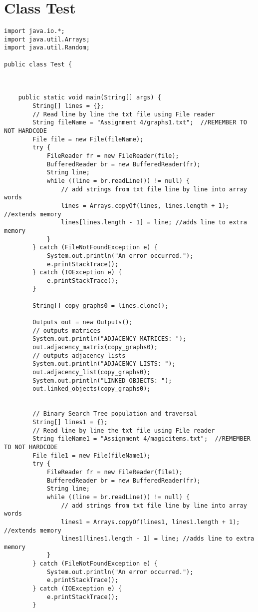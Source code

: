 \documentclass{article}
\begin{document}
\section{Class Test}
\begin{lstlisting}
import java.io.*;
import java.util.Arrays;
import java.util.Random;

public class Test {



    public static void main(String[] args) {
        String[] lines = {};
        // Read line by line the txt file using File reader
        String fileName = "Assignment 4/graphs1.txt";  //REMEMBER TO NOT HARDCODE
        File file = new File(fileName);
        try {
            FileReader fr = new FileReader(file);
            BufferedReader br = new BufferedReader(fr);
            String line;
            while ((line = br.readLine()) != null) {
                // add strings from txt file line by line into array words
                lines = Arrays.copyOf(lines, lines.length + 1); //extends memory
                lines[lines.length - 1] = line; //adds line to extra memory
            }
        } catch (FileNotFoundException e) {
            System.out.println("An error occurred.");
            e.printStackTrace();
        } catch (IOException e) {
            e.printStackTrace();
        }

        String[] copy_graphs0 = lines.clone();

        Outputs out = new Outputs();
        // outputs matrices
        System.out.println("ADJACENCY MATRICES: ");
        out.adjacency_matrix(copy_graphs0);
        // outputs adjacency lists
        System.out.println("ADJACENCY LISTS: ");
        out.adjacency_list(copy_graphs0);
        System.out.println("LINKED OBJECTS: ");
        out.linked_objects(copy_graphs0);


        // Binary Search Tree population and traversal
        String[] lines1 = {};
        // Read line by line the txt file using File reader
        String fileName1 = "Assignment 4/magicitems.txt";  //REMEMBER TO NOT HARDCODE
        File file1 = new File(fileName1);
        try {
            FileReader fr = new FileReader(file1);
            BufferedReader br = new BufferedReader(fr);
            String line;
            while ((line = br.readLine()) != null) {
                // add strings from txt file line by line into array words
                lines1 = Arrays.copyOf(lines1, lines1.length + 1); //extends memory
                lines1[lines1.length - 1] = line; //adds line to extra memory
            }
        } catch (FileNotFoundException e) {
            System.out.println("An error occurred.");
            e.printStackTrace();
        } catch (IOException e) {
            e.printStackTrace();
        }


\end{lstlisting}
\end{document}

